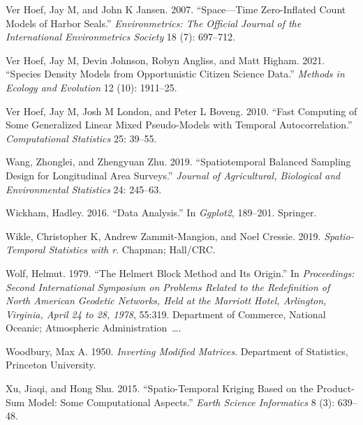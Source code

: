 \documentclass[smallextended]{svjour3}       %
\newlength{\cslhangindent}
\newlength{\cslentryspacingunit} %
\newenvironment{CSLReferences}[2] %
 {%
  \setlength{\parindent}{0pt}
  \ifodd #1
  \let\oldpar\par
  \def\par{\hangindent=\cslhangindent\oldpar}
  \fi
  \setlength{\parskip}{#2\cslentryspacingunit}
 }%
 {}
\begin{document}
\begin{CSLReferences}{1}{0}
\leavevmode{}%
Ver Hoef, Jay M, and John K Jansen. 2007. {``Space---Time Zero-Inflated
Count Models of Harbor Seals.''} \emph{Environmetrics: The Official
Journal of the International Environmetrics Society} 18 (7): 697--712.

\leavevmode{}%
Ver Hoef, Jay M, Devin Johnson, Robyn Angliss, and Matt Higham. 2021.
{``Species Density Models from Opportunistic Citizen Science Data.''}
\emph{Methods in Ecology and Evolution} 12 (10): 1911--25.

\leavevmode{}%
Ver Hoef, Jay M, Josh M London, and Peter L Boveng. 2010. {``Fast
Computing of Some Generalized Linear Mixed Pseudo-Models with Temporal
Autocorrelation.''} \emph{Computational Statistics} 25: 39--55.

\leavevmode{}%
Wang, Zhonglei, and Zhengyuan Zhu. 2019. {``Spatiotemporal Balanced
Sampling Design for Longitudinal Area Surveys.''} \emph{Journal of
Agricultural, Biological and Environmental Statistics} 24: 245--63.

\leavevmode{}%
Wickham, Hadley. 2016. {``Data Analysis.''} In \emph{Ggplot2}, 189--201.
Springer.

\leavevmode{}%
Wikle, Christopher K, Andrew Zammit-Mangion, and Noel Cressie. 2019.
\emph{Spatio-Temporal Statistics with r}. Chapman; Hall/CRC.

\leavevmode{}%
Wolf, Helmut. 1979. {``The Helmert Block Method and Its Origin.''} In
\emph{Proceedings: Second International Symposium on Problems Related to
the Redefinition of North American Geodetic Networks, Held at the
Marriott Hotel, Arlington, Virginia, April 24 to 28, 1978}, 55:319.
Department of Commerce, National Oceanic; Atmospheric
Administration~\ldots.

\leavevmode{}%
Woodbury, Max A. 1950. \emph{Inverting Modified Matrices}. Department of
Statistics, Princeton University.

\leavevmode{}%
Xu, Jiaqi, and Hong Shu. 2015. {``Spatio-Temporal Kriging Based on the
Product-Sum Model: Some Computational Aspects.''} \emph{Earth Science
Informatics} 8 (3): 639--48.

\end{CSLReferences}




\end{document}

